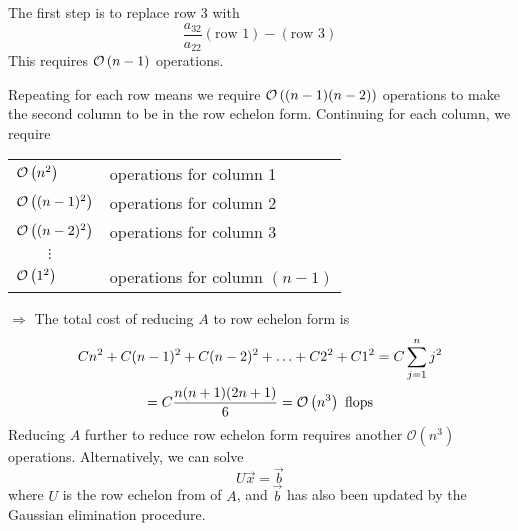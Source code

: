 The first step is to replace row 3 with 
%
\begin{equation*}
    \frac{a_{32}}{a_{22}} (\text{row 1})-(\text{row 3})
\end{equation*}
%
This requires $\mathcal{O}\left(n-1\right)$ operations.

Repeating for each row means we require 
$\mathcal{O}\left((n-1)(n-2)\right)$ operations to make the second column 
to be in the row echelon form.  
Continuing for each column, we require

\hspace{1em}
\begin{tabular}{ll}
    $\mathcal{O}\left(n^2\right)$ & operations for column 1 \\
    $\mathcal{O}\left((n-1)^2\right)$ & operations for column 2\\
    $\mathcal{O}\left((n-2)^2\right)$ & operations for column 3\\
    $\qquad\vdots$&\\
    $\mathcal{O}\left(1^2\right)$ & operations for column $(n-1)$
\end{tabular}

$\Rightarrow$ The total cost of reducing $A$ to row echelon form is 
%
\begin{gather*}
    Cn^2 + C(n-1)^2 + C(n-2)^2 + \ldots + C2^2 + C1^2 = C \sum_{j=1}^n j^2\\
    = C \frac{n(n+1)(2n+1)}{6} = \mathcal{O}\left(n^3\right) \text{ flops}
\end{gather*}
%
Reducing $A$ further to reduce row echelon form 
requires another $\mathcal{O}(n^3)$ operations.
Alternatively, we can solve 
%
\begin{equation*}
    U\Vec{x} = \Vec{b} 
\end{equation*}
%
where $U$ is the row echelon from of $A$, and 
$\Vec{b}$ has also been updated by the Gaussian
elimination procedure.

 
